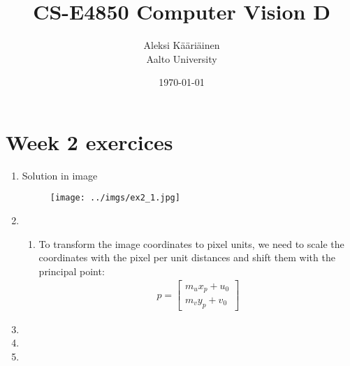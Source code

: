 \documentclass[11pt,a4paper]{article}
\title{CS-E4850 Computer Vision D}
\author{Aleksi Kääriäinen  \\
	Aalto University  \\
	}
\begin{document}
\date{\today}

\maketitle

\newpage

\section*{Week 2 exercices}

\begin{enumerate}

    \item Solution in image

          \begin{figure}[H]
              \centering
              \texttt{[image: ../imgs/ex2\_1.jpg]}
          \end{figure}

          \newpage

    \item

          \begin{enumerate}

              \item To transform the image coordinates to pixel units, we need to scale the coordinates with the pixel per unit distances and shift them with the principal point:
                    \begin{align*}
                        p = \begin{bmatrix}
                                m_u x_p + u_0 \\
                                m_v y_p + v_0
                            \end{bmatrix}
                    \end{align*}

          \end{enumerate}
          \newpage

    \item

          \newpage

    \item

          \newpage

    \item

          \newpage

\end{enumerate}
\end{document}
